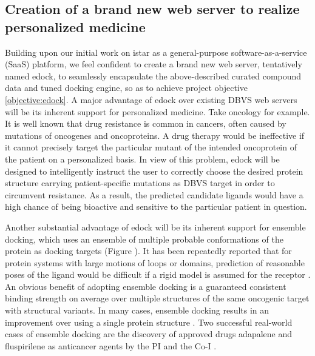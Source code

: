 \documentclass[a4paper,12pt]{article}
\begin{document}



\subsection*{Creation of a brand new web server to realize personalized medicine}

Building upon our initial work on istar \citep{1362} as a general-purpose software-as-a-service (SaaS) platform, we feel confident to create a brand new web server, tentatively named edock, to seamlessly encapsulate the above-described curated compound data and tuned docking engine, so as to achieve project objective \ref{objective:edock}. A major advantage of edock over existing DBVS web servers will be its inherent support for personalized medicine. Take oncology for example. It is well known that drug resistance is common in cancers, often caused by mutations of oncogenes and oncoproteins. A drug therapy would be ineffective if it cannot precisely target the particular mutant of the intended oncoprotein of the patient on a personalized basis. In view of this problem, edock will be designed to intelligently instruct the user to correctly choose the desired protein structure carrying patient-specific mutations as DBVS target in order to circumvent resistance. As a result, the predicted candidate ligands would have a high chance of being bioactive and sensitive to the particular patient in question.

Another substantial advantage of edock will be its inherent support for ensemble docking, which uses an ensemble of multiple probable conformations of the protein as docking targets (Figure ). It has been repeatedly reported that for protein systems with large motions of loops or domains, prediction of reasonable poses of the ligand would be difficult if a rigid model is assumed for the receptor \citep{1730}. An obvious benefit of adopting ensemble docking is a guaranteed consistent binding strength on average over multiple structures of the same oncogenic target with structural variants. In many cases, ensemble docking results in an improvement over using a single protein structure \citep{1128}. Two successful real-world cases of ensemble docking are the discovery of approved drugs adapalene and fluspirilene as anticancer agents by the PI and the Co-I \citep{1667,1681}.
\end{document}
